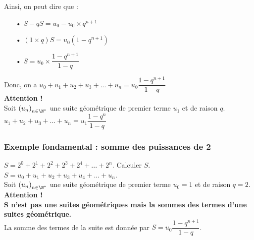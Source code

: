 Ainsi, on peut dire que : \\

\begin{itemize}
\item[•]$ S - qS = u_0 - u_0 \times q^{n+1}$ \\
\item[•] $\left(1 \times q\right)S = u_0 \left(1 - q^{n+1}\right)$ \\
\item[•] $S = u_0 \times \dfrac{1 - q^{n+1}}{1 - q}$ \\
\end{itemize}

\vspace*{.3cm}

Donc, on a $u_0 + u_1 + u_2 + u_3 + ... + u_n = u_0 \dfrac{1 - q^{n+1}}{1 - q}$ \\

\textbf{Attention !} \\

Soit $\left(u_n\right)_{n\in \N^*}$ une suite géométrique de premier terme $u_1$ et de raison $q$. \\

$u_1 + u_2 + u_3 + ... + u_n = u_1 \dfrac{1 - q^n}{1 - q}$

\newpage

\vspace*{-1.5cm}

\subsubsection{Exemple fondamental : somme des puissances de 2}

$S = 2^0 + 2^1 + 2^2 + 2^3 + 2^4 + ... + 2^n$. Calculer $S$. \\

$S = u_0 + u_1 + u_2 + u_3 + u_4 + ... + u_n$. \\

Soit $\left(u_n\right)_{n \in \N^*}$ une suite géométrique de premier terme $u_0 = 1$ et de raison $q = 2$. \\

\textbf{Attention !}  \\

\textbf{$\mathbf{S}$ n'est pas une suites géométriques mais la sommes des termes d'une suites géométrique.} \\

La somme des termes de la suite est donnée par $S = u_0\dfrac{1 - q^{n+1}}{1 - q}$. \\

